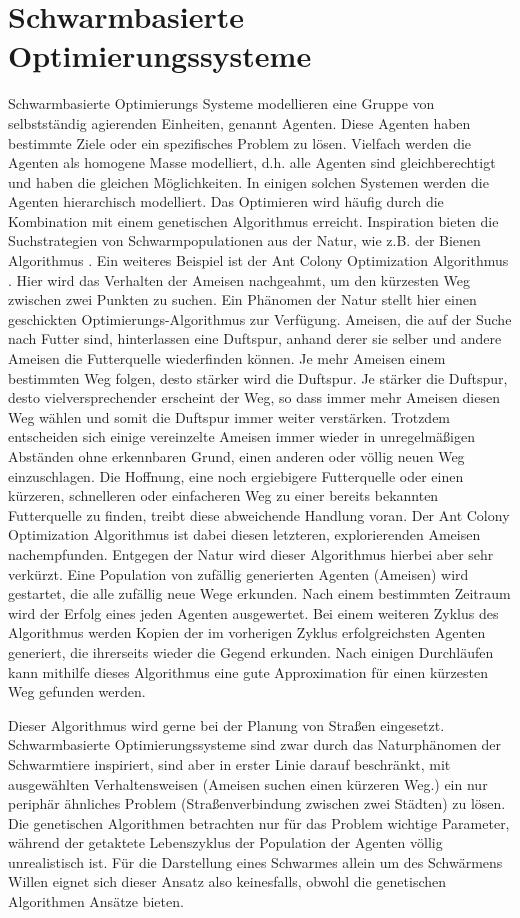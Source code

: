 \documentclass[draft=false
              ,paper=a4
              ,twoside=false
              ,fontsize=11pt
              ,headsepline
              ,BCOR10mm
              ,DIV11
              ,bibtotoc
              ,liststotoc
              ]{scrbook}
\begin{document}
\section{Schwarmbasierte Optimierungssysteme}
Schwarmbasierte Optimierungs Systeme modellieren eine Gruppe von selbstständig agierenden Einheiten, genannt Agenten. Diese Agenten haben bestimmte Ziele oder ein spezifisches Problem zu lösen. Vielfach werden die Agenten als homogene Masse modelliert, d.h. alle Agenten sind gleichberechtigt und haben die gleichen Möglichkeiten. In einigen solchen Systemen werden die Agenten hierarchisch modelliert. Das Optimieren wird häufig durch die Kombination mit einem genetischen Algorithmus erreicht. Inspiration bieten die Suchstrategien von Schwarmpopulationen aus der Natur, wie z.B. der Bienen Algorithmus \cite{citeulike:8377514}.
Ein weiteres Beispiel ist der Ant Colony Optimization Algorithmus \cite{ulster9737}. Hier wird das Verhalten der Ameisen nachgeahmt, um den kürzesten Weg zwischen zwei Punkten zu suchen. Ein Phänomen der Natur stellt hier einen geschickten Optimierungs-Algorithmus zur Verfügung. Ameisen, die auf der Suche nach Futter sind, hinterlassen eine Duftspur, anhand derer sie selber und andere Ameisen die Futterquelle wiederfinden können. Je mehr Ameisen einem bestimmten Weg folgen, desto stärker wird die Duftspur. Je stärker die Duftspur, desto vielversprechender erscheint der Weg, so dass immer mehr Ameisen diesen Weg wählen und somit die Duftspur immer weiter verstärken. Trotzdem entscheiden sich einige vereinzelte Ameisen immer wieder in unregelmäßigen Abständen ohne erkennbaren Grund, einen anderen oder völlig neuen Weg einzuschlagen. Die Hoffnung, eine noch ergiebigere Futterquelle oder einen kürzeren, schnelleren oder einfacheren Weg zu einer bereits bekannten Futterquelle zu finden, treibt diese abweichende Handlung voran. Der Ant Colony Optimization Algorithmus ist dabei diesen letzteren, explorierenden Ameisen nachempfunden. Entgegen der Natur wird dieser Algorithmus hierbei aber sehr verkürzt. Eine Population von zufällig generierten Agenten (Ameisen) wird gestartet, die alle zufällig neue Wege erkunden. Nach einem bestimmten Zeitraum wird der Erfolg eines jeden Agenten ausgewertet. Bei einem weiteren Zyklus des Algorithmus werden Kopien der im vorherigen Zyklus erfolgreichsten Agenten generiert, die ihrerseits wieder die Gegend erkunden. Nach einigen Durchläufen kann mithilfe dieses Algorithmus eine gute Approximation für einen kürzesten Weg gefunden werden.

Dieser Algorithmus wird gerne bei der Planung von Straßen eingesetzt. Schwarmbasierte Optimierungssysteme sind zwar durch das Naturphänomen der Schwarmtiere inspiriert, sind aber in erster Linie darauf beschränkt, mit ausgewählten Verhaltensweisen (Ameisen suchen einen kürzeren Weg.) ein nur periphär ähnliches Problem (Straßenverbindung zwischen zwei Städten) zu lösen. Die genetischen Algorithmen betrachten nur für das Problem wichtige Parameter, während der getaktete Lebenszyklus der Population der Agenten völlig unrealistisch ist. Für die Darstellung eines Schwarmes allein um des Schwärmens Willen eignet sich dieser Ansatz also keinesfalls, obwohl die genetischen Algorithmen Ansätze bieten.
\end{document}
